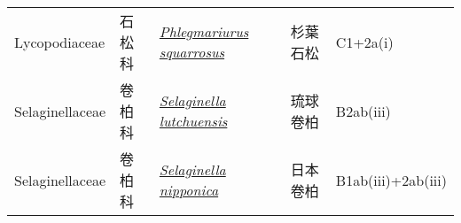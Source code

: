 {\begin{longtable}{p{2.5cm}p{2cm}p{5cm}p{2.5cm}p{3cm}}
    Lycopodiaceae & 石松科 & \href{http://www.theplantlist.org/tpl1.1/search?q=Phlegmariurus+squarrosus}{\textit{Phlegmariurus squarrosus} } & 杉葉石松 & C1+2a(i) \index{Phlegmariurus@\textit{Phlegmariurus}!squarrosus@\textit{squarrosus}}  \index{杉葉石松} \\
    Selaginellaceae & 卷柏科 & \href{http://www.theplantlist.org/tpl1.1/search?q=Selaginella+lutchuensis}{\textit{Selaginella lutchuensis} } & 琉球卷柏 & B2ab(iii) \index{Selaginella@\textit{Selaginella}!lutchuensis@\textit{lutchuensis}}  \index{琉球卷柏} \\
    Selaginellaceae & 卷柏科 & \href{http://www.theplantlist.org/tpl1.1/search?q=Selaginella+nipponica}{\textit{Selaginella nipponica} } & 日本卷柏 & B1ab(iii)+2ab(iii) \index{Selaginella@\textit{Selaginella}!nipponica@\textit{nipponica}}  \index{日本卷柏} \\
    \bottomrule
        \end{longtable}
        }
    